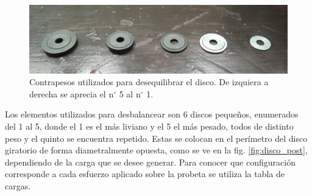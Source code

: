 \begin{figure}[h]
\centering
\includegraphics[width=1\linewidth]{Imagenes/contrapesos.jpg}
\caption{Contrapesos utilizados para desequilibrar el disco. De izquiera a derecha se aprecia el n$^{\circ}$ 5 al n$^{\circ}$ 1.}
\label{fig:contrapesos}
\end{figure}

Los elementos utilizados para desbalancear son 6 discos pequeños, enumerados del 1 al 5, donde el 1 es el más liviano y el 5 el más pesado, todos de distinto peso y el quinto se encuentra repetido. Estas se colocan en el perímetro del disco giratorio de forma diametralmente opuesta, como se ve en la fig. \ref{fig:disco_post}, dependiendo de la carga que se desee generar. Para conocer que configuración corresponde a cada esfuerzo aplicado sobre la probeta se utiliza la tabla de cargas.

